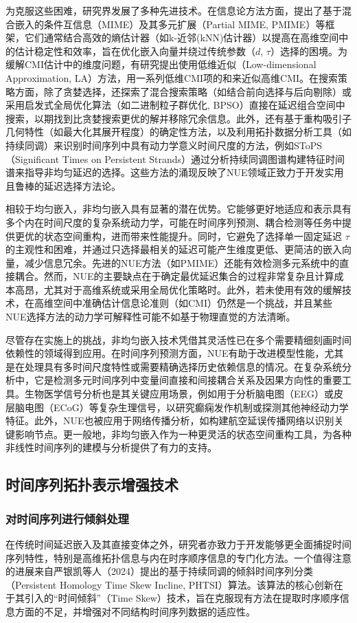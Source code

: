 为克服这些困难，研究界发展了多种先进技术。在信息论方法方面，提出了基于混合嵌入的条件互信息（MIME）及其多元扩展（Partial MIME, PMIME）等框架，它们通常结合高效的熵估计器（如k-近邻(kNN)估计器）以提高在高维空间中的估计稳定性和效率，旨在优化嵌入向量并绕过传统参数（$d$, $\tau$）选择的困境。为缓解CMI估计中的维度问题，有研究提出使用低维近似（Low-dimensional Approximation, LA）方法，用一系列低维CMI项的和来近似高维CMI。在搜索策略方面，除了贪婪选择，还探索了混合搜索策略（如结合前向选择与后向剔除）或采用启发式全局优化算法（如二进制粒子群优化, BPSO）直接在延迟组合空间中搜索，以期找到比贪婪搜索更优的解并移除冗余信息。此外，还有基于重构吸引子几何特性（如最大化其展开程度）的确定性方法，以及利用拓扑数据分析工具（如持续同调）来识别时间序列中具有动力学意义时间尺度的方法，例如SToPS（Significant Times on Persistent Strands）通过分析持续同调图谱构建特征时间谱来指导非均匀延迟的选择。这些方法的涌现反映了NUE领域正致力于开发实用且鲁棒的延迟选择方法论。

相较于均匀嵌入，非均匀嵌入具有显著的潜在优势。它能够更好地适应和表示具有多个内在时间尺度的复杂系统动力学，可能在时间序列预测、耦合检测等任务中提供更优的状态空间重构，进而带来性能提升。同时，它避免了选择单一固定延迟 $\tau$ 的主观性和困难，并通过只选择最相关的延迟可能产生维度更低、更简洁的嵌入向量，减少信息冗余。先进的NUE方法（如PMIME）还能有效检测多元系统中的直接耦合。然而，NUE的主要缺点在于确定最优延迟集合的过程非常复杂且计算成本高昂，尤其对于高维系统或采用全局优化策略时。此外，若未使用有效的缓解技术，在高维空间中准确估计信息论准则（如CMI）仍然是一个挑战，并且某些NUE选择方法的动力学可解释性可能不如基于物理直觉的方法清晰。

尽管存在实施上的挑战，非均匀嵌入技术凭借其灵活性已在多个需要精细刻画时间依赖性的领域得到应用。在时间序列预测方面，NUE有助于改进模型性能，尤其是在处理具有多时间尺度特性或需要精确选择历史依赖信息的情况。在复杂系统分析中，它是检测多元时间序列中变量间直接和间接耦合关系及因果方向性的重要工具。生物医学信号分析也是其关键应用场景，例如用于分析脑电图（EEG）或皮层脑电图（ECoG）等复杂生理信号，以研究癫痫发作机制或探测其他神经动力学特征。此外，NUE也被应用于网络传播分析，如构建航空延误传播网络以识别关键影响节点。更一般地，非均匀嵌入作为一种更灵活的状态空间重构工具，为各种非线性时间序列的建模与分析提供了有力的支持。

\subsection{时间序列拓扑表示增强技术}
\subsubsection{对时间序列进行倾斜处理}
在传统时间延迟嵌入及其直接变体之外，研究者亦致力于开发能够更全面捕捉时间序列特性，特别是高维拓扑信息与内在时序顺序信息的专门化方法。一个值得注意的进展来自严银凯等人（2024）\cite{JSJC202406009}提出的基于持续同调的倾斜时间序列分类（Persistent Homology Time Skew Incline, PHTSI）算法。该算法的核心创新在于其引入的“时间倾斜”（Time Skew）技术，旨在克服现有方法在提取时序顺序信息方面的不足，并增强对不同结构时间序列数据的适应性。

